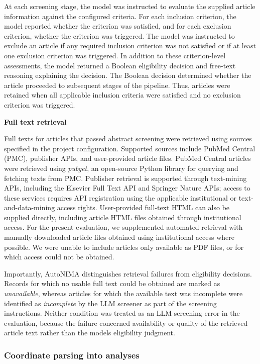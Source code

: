 At each screening stage, the model was instructed to evaluate the supplied article information against the configured criteria. For each inclusion criterion, the model reported whether the criterion was satisfied, and for each exclusion criterion, whether the criterion was triggered. The model was instructed to exclude an article if any required inclusion criterion was not satisfied or if at least one exclusion criterion was triggered. In addition to these criterion-level assessments, the model returned a Boolean eligibility decision and free-text reasoning explaining the decision. The Boolean decision determined whether the article proceeded to subsequent stages of the pipeline. Thus, articles were retained when all applicable inclusion criteria were satisfied and no exclusion criterion was triggered.

\textbf{Full text retrieval}

Full texts for articles that passed abstract screening were retrieved using sources specified in the project configuration. Supported sources include PubMed Central (PMC), publisher APIs, and user-provided article files. PubMed Central articles were retrieved using \emph{pubget}, an open-source Python library for querying and fetching texts from PMC. Publisher retrieval is supported through text-mining APIs, including the Elsevier Full Text API and Springer Nature APIs; access to these services requires API registration using the applicable institutional or text-and-data-mining access rights. User-provided full-text HTML can also be supplied directly, including article HTML files obtained through institutional access. For the present evaluation, we supplemented automated retrieval with manually downloaded article files obtained using institutional access where possible. We were unable to include articles only available as PDF files, or for which access could not be obtained.

Importantly, AutoNIMA distinguishes retrieval failures from eligibility decisions. Records for which no usable full text could be obtained are marked as \emph{unavailable}, whereas articles for which the available text was incomplete were identified as \emph{incomplete} by the LLM screener as part of the screening instructions. Neither condition was treated as an LLM screening error in the evaluation, because the failure concerned availability or quality of the retrieved article text rather than the model\textquotesingle s eligibility judgment.

\subsubsection{Coordinate parsing into analyses}

